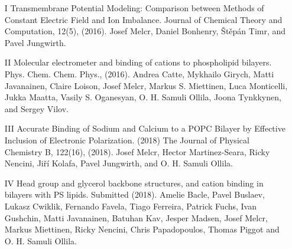 \documentclass[12pt,a4paper,twoside,openright]{report}
\let\openright=\cleardoublepage
\begin{document}





\begin{itemize}
\item[I] 
Transmembrane Potential Modeling: Comparison between Methods of Constant Electric
Field and Ion Imbalance. 
Journal of Chemical Theory and Computation, 12(5), (2016). 
Josef Melcr, Daniel Bonhenry, Štěpán Timr, and Pavel Jungwirth. 

\item[II] 
Molecular electrometer and binding of cations to phospholipid bilayers. 
Phys. Chem. Chem. Phys., (2016).
Andrea Catte, Mykhailo Girych, Matti Javanainen, Claire Loison, Josef Melcr,
Markus S. Miettinen, Luca Monticelli, Jukka Maatta, Vasily S. Oganesyan,
O. H. Samuli Ollila, Joona Tynkkynen, and Sergey Vilov. 

\item[III]
Accurate Binding of Sodium and Calcium to a POPC Bilayer by Effective Inclusion of Electronic Polarization. (2018)
The Journal of Physical Chemistry B, 122(16), (2018).
Josef Melcr, Hector Martinez-Seara, Ricky Nencini, Jiří Kolafa, Pavel Jungwirth,
and O. H. Samuli Ollila. 

\item[IV]
Head group and glycerol backbone structures,
and cation binding in bilayers with PS lipids. Submitted (2018).
Amelie Bacle, Pavel Buslaev, Lukasz Cwiklik, Fernando Favela, Tiago Ferreira,
Patrick Fuchs, Ivan Gushchin, Matti Javanainen, Batuhan Kav, Jesper Madsen, 
Josef Melcr, Markus Miettinen, Ricky Nencini,  Chris Papadopoulos, Thomas Piggot 
and O. H. Samuli Ollila. 

\end{itemize}

\appendix

\openright
\end{document}
